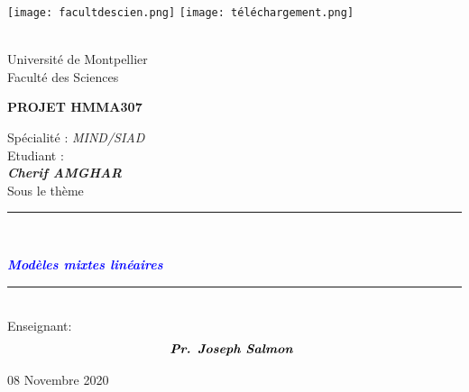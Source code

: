 \documentclass[10pt,a4paper,]{report}
\begin{document}
	\texttt{[image: facultdescien.png]} \hfill{\texttt{[image: téléchargement.png]}}
	\\
	\\
	\begin{center}
		Université de Montpellier\\
		Faculté des Sciences \\
		\vspace*{2.0cm}
		
		\textbf{PROJET HMMA307 }\\
		\vspace{1.5cm}
		
		Spécialité : \textsl{MIND/SIAD} \\
		\vspace{1.5cm}
		Etudiant :\\
	
		\textit{\textbf{ Cherif AMGHAR}}\\
		\vspace*{3cm} 
		Sous le thème 
		\rule{16cm}{4pt}\\
		\begin{cursive}
			\textcolor{blue}{\textbf{\textit{\Large{Modèles mixtes linéaires}}}} 
		\end{cursive}
		\rule{14cm}{3pt}\\
		\vspace*{1.5cm}
		Enseignant: 
		\vspace*{1.5cm}
		$$
		\begin{array}{lll}

        \textit{\textbf{Pr.  Joseph Salmon  }}
	    \end{array}
		$$
		
		
		\vspace*{1cm}
		08 Novembre 2020
	\end{center}
    \newpage
\end{document}
